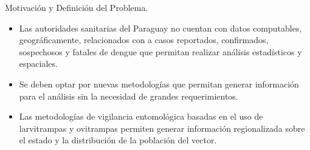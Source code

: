 \begin{frame}[t]{Motivación y Definición del Problema.}
  \begin{itemize}

    \item Las autoridades sanitarias del Paraguay no cuentan con datos computables, geográficamente, relacionados con a casos reportados, confirmados, sospechosos y fatales de dengue que permitan realizar análisis estadísticos y espaciales.

    \item  Se deben optar por nuevas metodologías que permitan generar información para el análisis sin la necesidad de grandes requerimientos.

    \item Las metodologías de vigilancia entomológica basadas en el uso de larvitrampas y ovitrampas permiten generar información regionalizada sobre el estado y la distribución de la población del vector.

  \end{itemize}
\end{frame}

